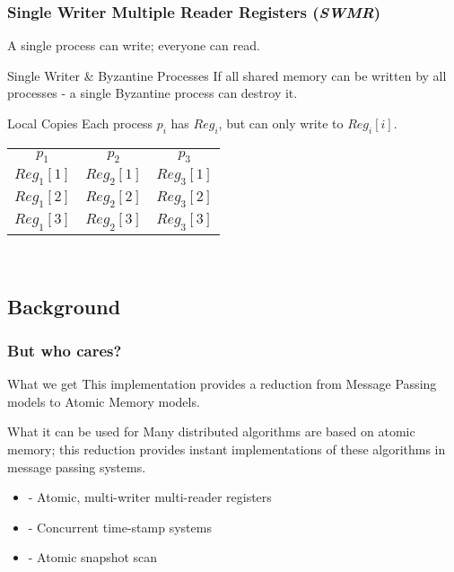 \documentclass{beamer}
\begin{document}
\begin{frame}
    \frametitle{Single Writer Multiple Reader Registers (\emph{SWMR})}
    A single process can write; everyone can read.\\
    \begin{block}{Single Writer \& Byzantine Processes}
        If all shared memory can be written by all processes - a single Byzantine process can destroy it.
    \end{block}
    \begin{block}{Local Copies}
    Each process $p_i$ has $Reg_i$, but can only write to \alert{$Reg_i[i]$}.
        \begin{tabular}{c c c}
            $p_1$ & $p_2$ & $p_3$ \\
            \alert{$Reg_1[1]$} & $Reg_2[1]$ & $Reg_3[1]$ \\  
            $Reg_1[2]$ & \alert{$Reg_2[2]$} & $Reg_3[2]$ \\  
            $Reg_1[3]$ & $Reg_2[3]$ & \alert{$Reg_3[3]$}
        \end{tabular}\\
    \end{block}
\end{frame}

\subsection{Background}
\begin{frame}
    \frametitle{But who cares?}
    \begin{block}{What we get}
        This implementation provides a reduction from Message Passing models to Atomic Memory models.
    \end{block}
    \begin{block}{What it can be used for}
        Many distributed algorithms are based on atomic memory; this reduction provides instant implementations
        of these algorithms in message passing systems.
    \end{block}
    \begin{examples}
        \begin{itemize}
            \item - Atomic, multi-writer multi-reader registers 
            \item - Concurrent time-stamp systems
            \item - Atomic snapshot scan
        \end{itemize}
    \end{examples}
\end{frame}
\end{document}
